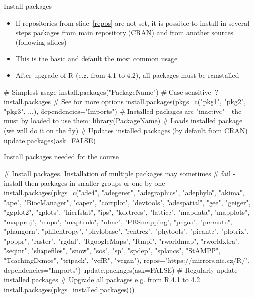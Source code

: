 \documentclass[compress, ucs, xelatex, 11pt, xcolor=svgnames, aspectratio=169,
	hyperref={
		bookmarks=true,
		unicode=true,
		colorlinks=true,
		pdftitle={Molecular data in R},
		plainpages=false,
		pdfauthor={Vojtech Zeisek},
		pdfsubject={Course about phylogeny and evolution in R},
		pdfcreator={XeLaTeX},
		pdfkeywords={R, evolution, phylogeny, molecular data},
		linkcolor=Crimson, %
		anchorcolor=Magenta, %
		citecolor=Magenta, %
		filecolor=Magenta, %
		menucolor=Magenta, %
		urlcolor=DodgerBlue, %
		pdftex},
	url={hyphens, lowtilde} %
	]{beamer}
\begin{document}
\begin{frame}[fragile]{Install packages}
	\begin{itemize}
		\item If repositories from slide~\ref{repos} are not set, it is possible to install in several steps packages from main repository (CRAN) and from another sources (following slides)
		\item This is the basic and default the most common usage
		\item After upgrade of R (e.g. from 4.1 to 4.2), all packages must be reinstalled
	\end{itemize}
	\begin{spluscode}
    # Simplest usage
    install.packages("PackageName") # Case sensitive!
    ?install.packages # See for more options
    install.packages(pkgs=c("pkg1", "pkg2", "pkg3", ...),
      dependencies="Imports")
    # Installed packages are "inactive" - the must by loaded to use them:
    library(PackageName) # Loads installed package (we will do it on the fly)
    # Updates installed packages (by default from CRAN)
    update.packages(ask=FALSE)
	\end{spluscode}
\end{frame}

\begin{frame}[fragile]{Install packages needed for the course}
	\begin{spluscode}
    # Install packages. Installation of multiple packages may sometimes
    # fail - install then packages in smaller groups or one by one
    install.packages(pkgs=c("ade4", "adegenet", "adegraphics", "adephylo",
      "akima", "ape", "BiocManager", "caper", "corrplot", "devtools",
      "adespatial", "gee", "geiger", "ggplot2", "gplots", "hierfstat", "ips",
      "kdetrees", "lattice", "mapdata", "mapplots", "mapproj", "maps",
      "maptools", "nlme", "PBSmapping", "pegas", "permute", "phangorn",
      "philentropy", "phylobase", "rentrez", "phytools", "picante", "plotrix",
      "poppr", "raster", "rgdal", "RgoogleMaps", "Rmpi", "rworldmap",
      "rworldxtra", "seqinr", "shapefiles", "snow", "sos", "sp", "spdep",
      "splancs", "StAMPP", "TeachingDemos", "tripack", "vcfR", "vegan"),
      repos="https://mirrors.nic.cz/R/", dependencies="Imports")
    update.packages(ask=FALSE) # Regularly update installed packages
    # Upgrade all packages e.g. from R 4.1 to 4.2
    install.packages(pkgs=installed.packages())
	\end{spluscode}
\end{frame}
\end{document}
